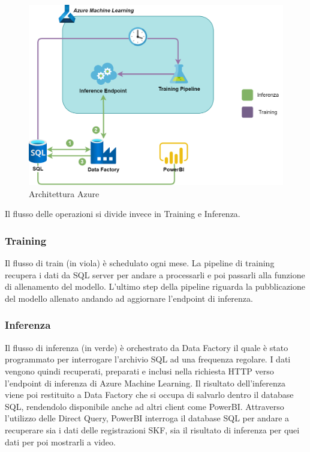 \begin{figure}[t]
		
	\centering
	\includegraphics[width=14cm, scale=1]{images/deploy_scheme}
	\caption{Architettura Azure}
	\label{azure}
	
\end{figure}


Il flusso delle operazioni si divide invece in Training e Inferenza.

\subsubsection{Training}
Il flusso di train (in viola) è schedulato ogni mese. La pipeline di training recupera i dati da SQL server per andare a processarli e poi passarli alla funzione di allenamento del modello. L'ultimo step della pipeline riguarda la pubblicazione del modello allenato andando ad aggiornare l'endpoint di inferenza.

\subsubsection{Inferenza}
Il flusso di inferenza (in verde) è orchestrato da Data Factory il quale è stato programmato per interrogare l'archivio SQL ad una frequenza regolare. I dati vengono quindi recuperati, preparati e inclusi nella richiesta HTTP verso l'endpoint di inferenza di Azure Machine Learning. Il risultato dell'inferenza viene poi restituito a Data Factory che si occupa di salvarlo dentro il database SQL, rendendolo disponibile anche ad altri client come PowerBI. Attraverso l'utilizzo delle Direct Query, PowerBI interroga il database SQL per andare a recuperare sia i dati delle registrazioni SKF, sia il risultato di inferenza per quei dati per poi mostrarli a video.


